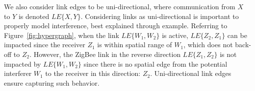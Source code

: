 We also consider link edges to be uni-directional, where communication from $X$ to $Y$ is denoted $LE\{X,Y\}$.  Considering links as uni-directional is important to properly model interference, best explained through example.  Referring to Figure~\ref{fig:hypergraph}, when the link $LE\{W_1,W_2\}$ is active, $LE\{Z_2,Z_1\}$ can be impacted since the receiver $Z_1$ is within spatial range of $W_1$, which does not back-off to $Z_2$.  However, the ZigBee link in the reverse direction $LE\{Z_1,Z_2\}$ is not impacted by $LE\{W_1,W_2\}$ since there is no spatial edge from the potential interferer $W_1$ to the receiver in this direction: $Z_2$. Uni-directional link edges ensure capturing such behavior.



%

